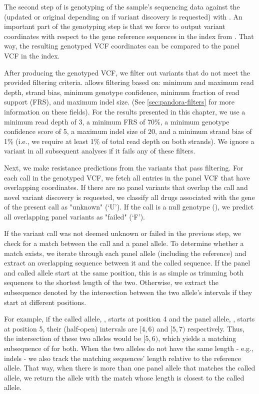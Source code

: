 The second step of  is genotyping of the sample's sequencing data against the \prg{} (updated or original depending on if variant discovery is requested) with \pandora{} . An important part of the genotyping step is that we force \pandora{} to output variant coordinates with respect to the gene reference sequences in the index from . That way, the resulting genotyped VCF coordinates can be compared to the panel VCF in the index. 

After producing the \pandora{} genotyped VCF, we filter out variants that do not meet the provided filtering criteria. \drprg{}  allows filtering based on: minimum and maximum read depth, strand bias, minimum genotype confidence, minimum fraction of read support (FRS), and maximum indel size. (See \autoref{sec:pandora-filters} for more information on these fields). For the results presented in this chapter, we use a minimum read depth of 3, a minimum FRS of 70\%, a minimum genotype confidence score of 5, a maximum indel size of 20, and a minimum strand bias of 1\% (i.e., we require at least 1\% of total read depth on both strands). We ignore a variant in all subsequent analyses if it fails any of these filters.

Next, we make resistance predictions from the variants that pass filtering. For each call in the genotyped VCF, we fetch all entries in the panel VCF that have overlapping coordinates. If there are no panel variants that overlap the call and novel variant discovery is requested, we classify all drugs associated with the gene of the present call as "unknown" (`U'). If the call is a null genotype (), we predict all overlapping panel variants as "failed" (`F').

If the variant call was not deemed unknown or failed in the previous step, we check for a match between the call and a panel allele. To determine whether a match exists, we iterate through each panel allele (including the reference) and extract an overlapping sequence between it and the called sequence. If the panel and called allele start at the same position, this is as simple as trimming both sequences to the shortest length of the two. Otherwise, we extract the subsequence denoted by the intersection between the two allele's intervals if they start at different positions. 

For example, if the called allele, , starts at position 4 and the panel allele, , starts at position 5, their (half-open) intervals are $[4,6)$ and $[5,7)$ respectively. Thus, the intersection of these two alleles would be $[5,6)$, which yields a matching subsequence of  for both. When the two alleles do not have the same length - e.g., indels - we also track the matching sequences' length relative to the reference allele. That way, when there is more than one panel allele that matches the called allele, we return the allele with the match whose length is closest to the called allele.

